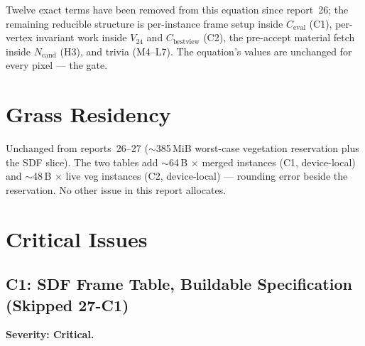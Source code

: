 \documentclass[11pt,a4paper]{article}
\begin{document}
Twelve exact terms have been removed from this equation since report~26;
the remaining reducible structure is per-instance frame setup inside
$C_{\mathrm{eval}}$ (C1), per-vertex invariant work inside $V_{24}$ and
$C_{\mathrm{bestview}}$ (C2), the pre-accept material fetch inside
$N_{\mathrm{cand}}$ (H3), and trivia (M4--L7). The equation's values are
unchanged for every pixel --- the gate.

\section{Grass Residency}

Unchanged from reports~26--27 ($\sim$385\,MiB worst-case vegetation
reservation plus the SDF slice). The two tables add $\sim$64\,B
$\times$ merged instances (C1, device-local) and $\sim$48\,B $\times$ live
veg instances (C2, device-local) --- rounding error beside the reservation.
No other issue in this report allocates.

\section{Critical Issues}

\subsection{C1: SDF Frame Table, Buildable Specification (Skipped 27-C1)}
\label{sec:c1}

\textbf{Severity: Critical.}
\end{document}

